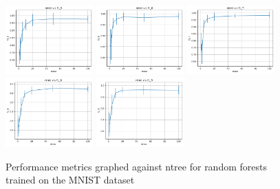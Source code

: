 \begin{figure}
    \includegraphics[width=0.30\textwidth]{figures/mnist_random_forest_f1_5.pdf}
    \includegraphics[width=0.30\textwidth]{figures/mnist_random_forest_f1_6.pdf}
    \includegraphics[width=0.30\textwidth]{figures/mnist_random_forest_f1_7.pdf}
    \includegraphics[width=0.30\textwidth]{figures/mnist_random_forest_f1_8.pdf}
    \includegraphics[width=0.30\textwidth]{figures/mnist_random_forest_f1_9.pdf}
    \caption{Performance metrics graphed against ntree for random forests trained on the MNIST
             dataset}
    \label{fig:mnist_random_forest}
\end{figure}
